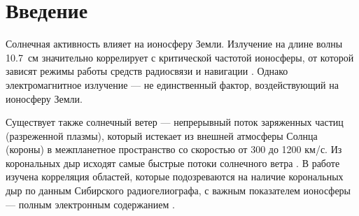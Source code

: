\documentclass{article}
\begin{document}

\printAffiliationsAndNotice{}

\begin{abstract}
Солнечная активность влияет на ионосферу Земли. Помимо электромагнитного
излучения, на ионосферу воздействует солнечный ветер --- поток заряженных
частиц, ускоряемый, в частности, в корональных дырах. В данной работе
исследована взаимосвязь
областей, похожих на корональные дыры, с полным электронным содержанием
ионосферы (ПЭС). Найдена слабая отрицательная корреляция (коэффициент
корреляции Пирсона) между площадью тёмных областей и параметром ПЭС для
скорости солнечного ветра 800 км/с. Это может говорить как о незначительном
влиянии площади корональных дыр на ионосферу, так и о недостаточно точном
способе определения реальной площади корональных дыр Солнца.
\end{abstract}

\section{Введение}

Солнечная активность влияет на ионосферу Земли. Излучение на длине волны
10.7~см значительно коррелирует с критической частотой ионосферы, от которой
зависят режимы работы средств радиосвязи и навигации \citep{tapping2013f107}.
Однако электромагнитное излучение --- не единственный фактор, воздействующий
на ионосферу Земли.

Существует также солнечный ветер --- непрерывный поток заряженных частиц
(разреженной плазмы), который истекает из внешней атмосферы Солнца (короны)
в межпланетное пространство со скоростью от 300 до 1200 км/с. Из корональных
дыр исходят самые быстрые потоки солнечного ветра \citep{cranmer2019properties}.
В работе изучена корреляция областей, которые подозреваются на наличие
корональных дыр по данным Сибирского радиогелиографа, с важным показателем
ионосферы --- полным электронным содержанием \citep{afraimovich2008gec}.
\end{document}
